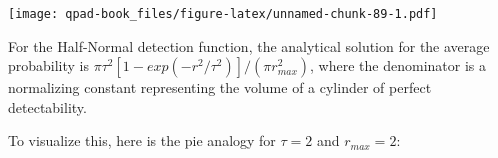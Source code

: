 \documentclass[12pt,]{book}
\newenvironment{Shaded}{\begin{snugshade}}{\end{snugshade}}
\newcommand{\ControlFlowTok}[1]{\textcolor[rgb]{0.13,0.29,0.53}{\textbf{#1}}}
\newcommand{\DataTypeTok}[1]{\textcolor[rgb]{0.13,0.29,0.53}{#1}}
\newcommand{\DecValTok}[1]{\textcolor[rgb]{0.00,0.00,0.81}{#1}}
\newcommand{\KeywordTok}[1]{\textcolor[rgb]{0.13,0.29,0.53}{\textbf{#1}}}
\newcommand{\NormalTok}[1]{#1}
\newcommand{\OperatorTok}[1]{\textcolor[rgb]{0.81,0.36,0.00}{\textbf{#1}}}
\newcommand{\StringTok}[1]{\textcolor[rgb]{0.31,0.60,0.02}{#1}}
\begin{document}
\begin{Shaded}
\end{Shaded}

\texttt{[image: qpad-book\_files/figure-latex/unnamed-chunk-89-1.pdf]}

For the Half-Normal detection function, the analytical solution for the
average probability is
\(\pi \tau^2 [1-exp(-r^2/\tau^2)] / (\pi r_{max}^2)\),
where the denominator is a normalizing constant
representing the volume of a cylinder of perfect detectability.

To visualize this, here is the pie analogy for
\(\tau=2\) and \(r_{max}=2\):
\end{document}
